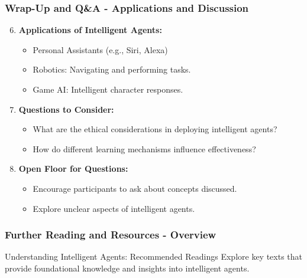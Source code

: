 \documentclass[aspectratio=169]{beamer}
\begin{document}
\begin{frame}[fragile]
    \frametitle{Wrap-Up and Q\&A - Applications and Discussion}
    
    \begin{enumerate}
        \setcounter{enumi}{5}
        \item \textbf{Applications of Intelligent Agents:}
            \begin{itemize}
                \item Personal Assistants (e.g., Siri, Alexa)
                \item Robotics: Navigating and performing tasks.
                \item Game AI: Intelligent character responses.
            \end{itemize}
        
        \item \textbf{Questions to Consider:}
            \begin{itemize}
                \item What are the ethical considerations in deploying intelligent agents?
                \item How do different learning mechanisms influence effectiveness?
            \end{itemize}
        
        \item \textbf{Open Floor for Questions:}
            \begin{itemize}
                \item Encourage participants to ask about concepts discussed.
                \item Explore unclear aspects of intelligent agents.
            \end{itemize}
    \end{enumerate}
\end{frame}

\begin{frame}[fragile]
  \frametitle{Further Reading and Resources - Overview}

  \begin{block}{Understanding Intelligent Agents: Recommended Readings}
    Explore key texts that provide foundational knowledge and insights into intelligent agents.
  \end{block}
\end{frame}
\end{document}
